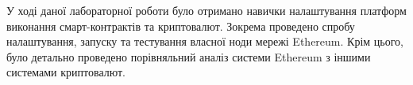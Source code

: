 У ході даної лабораторної роботи було отримано навички налаштування платформ виконання смарт-контрактів та криптовалют. Зокрема проведено спробу налаштування, запуску та тестування власної ноди мережі Ethereum. Крім цього, було детально проведено порівняльний аналіз системи Ethereum з іншими системами криптовалют.

